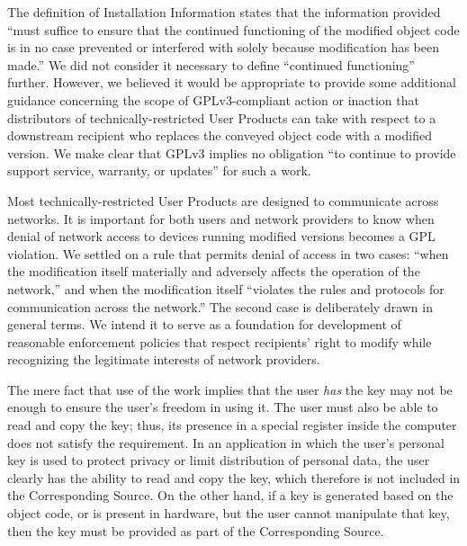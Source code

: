 The definition of Installation Information states that the information
provided ``must suffice to ensure that the continued functioning of the
modified object code is in no case prevented or interfered with solely
because modification has been made.''  We did not consider it necessary to
define ``continued functioning'' further. However, we believed it would be
appropriate to provide some additional guidance concerning the scope of
GPLv3-compliant action or inaction that distributors of
technically-restricted User Products can take with respect to a downstream
recipient who replaces the conveyed object code with a modified version.  We
make clear that GPLv3 implies no obligation ``to continue to provide support
service, warranty, or updates'' for such a work.

Most technically-restricted User Products are designed to communicate across
networks.  It is important for both users and network providers to know when
denial of network access to devices running modified versions becomes a GPL
violation.  We settled on a rule that permits denial of access in two cases:
``when the modification itself materially and adversely affects the operation
of the network,'' and when the modification itself ``violates the rules and
protocols for communication across the network.''  The second case is
deliberately drawn in general terms.  We intend it to serve as a foundation
for development of reasonable enforcement policies that respect recipients'
right to modify while recognizing the legitimate interests of network
providers.


The mere fact that use of the work implies that the user \textit{has} the key
may not be enough to ensure the user's freedom in using it.  The user must
also be able to read and copy the key; thus, its presence in a special
register inside the computer does not satisfy the requirement. In an
application in which the user's personal key is used to protect privacy or
limit distribution of personal data, the user clearly has the ability to read
and copy the key, which therefore is not included in the Corresponding
Source. On the other hand, if a key is generated based on the object code, or
is present in hardware, but the user cannot manipulate that key, then the key
must be provided as part of the Corresponding Source.


